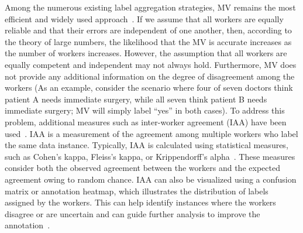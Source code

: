 Among the numerous existing label aggregation strategies, MV remains the most efficient and widely used approach~\cite{tao_Label_2020}. If we assume that all workers are equally reliable and that their errors are independent of one another, then, according to the theory of large numbers, the likelihood that the MV is accurate increases as the number of workers increases. However, the assumption that all workers are equally competent and independent may not always hold. Furthermore, MV does not provide any additional information on the degree of disagreement among the workers (As an example, consider the scenario where four of seven doctors think patient A needs immediate surgery, while all seven think patient B needs immediate surgery; MV will simply label ``yes'' in both cases).
To address this problem, additional measures such as inter-worker agreement (IAA) have been used~\cite{artstein_InterAnnotator_2017}. IAA is a measurement of the agreement among multiple workers who label the same data instance. Typically, IAA is calculated using statistical measures, such as Cohen's kappa, Fleiss's kappa, or Krippendorff's alpha~\cite{krippendorff_Content_2018}. These measures consider both the observed agreement between the workers and the expected agreement owing to random chance. IAA can also be visualized using a confusion matrix or annotation heatmap, which illustrates the distribution of labels assigned by the workers. This can help identify instances where the workers disagree or are uncertain and can guide further analysis to improve the annotation~\cite{carletta_Assessing_1996}.
